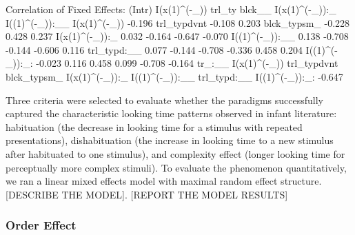 \documentclass[10pt, letterpaper]{article}
\newenvironment{CodeChunk}{}{}
\begin{document}
\begin{CodeChunk}
\begin{CodeOutput}
Correlation of Fixed Effects:
               (Intr) I(x(1)^(-_)) trl_ty blck__ I(x(1)^(-_)):_ I((1)^(-_)):__
I(x(1)^(-_))   -0.196                                                         
trl_typdvnt    -0.108  0.203                                                  
blck_typsm_    -0.228  0.428        0.237                                     
I(x(1)^(-_)):_  0.032 -0.164       -0.647 -0.070                              
I((1)^(-_)):__  0.138 -0.708       -0.144 -0.606  0.116                       
trl_typd:__     0.077 -0.144       -0.708 -0.336  0.458          0.204        
I((1)^(-_)):_: -0.023  0.116        0.458  0.099 -0.708         -0.164        
               tr_:__
I(x(1)^(-_))         
trl_typdvnt          
blck_typsm_          
I(x(1)^(-_)):_       
I((1)^(-_)):__       
trl_typd:__          
I((1)^(-_)):_: -0.647
\end{CodeOutput}
\end{CodeChunk}

Three criteria were selected to evaluate whether the paradigms successfully captured the characteristic looking time patterns observed in infant literature: habituation (the decrease in looking time for a stimulus with repeated presentations), dishabituation (the increase in looking time to a new stimulus after habituated to one stimulus), and complexity effect (longer looking time for perceptually more complex stimuli). To evaluate the phenomenon quantitatively, we ran a linear mixed effects model with maximal random effect structure. {[}DESCRIBE THE MODEL{]}. {[}REPORT THE MODEL RESULTS{]}

\hypertarget{order-effect}{%
\subsubsection{Order Effect}\label{order-effect}}
\end{document}
